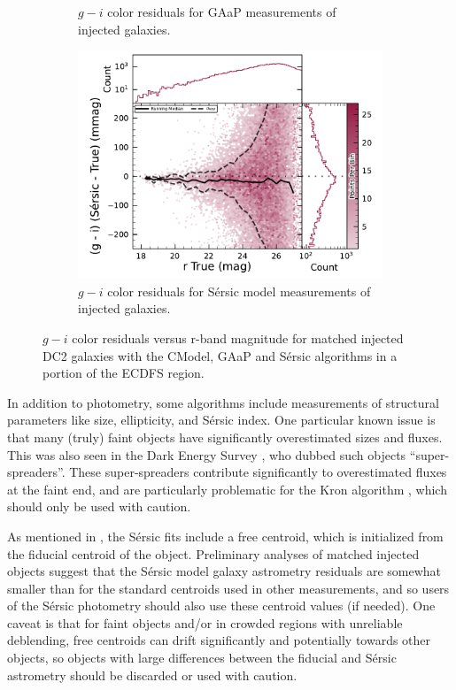 \begin{figure}[hbt!]
\begin{subfigure}[t]{0.31\textwidth}
  \caption{$g-i$ color residuals for \gls{GAaP} measurements of injected galaxies.}
  \end{subfigure}\hfill
    \begin{subfigure}[t]{0.31\textwidth}
\includegraphics[width=\linewidth]{injected_lsst_cells_v1_5063_r_color_sersic_g_minus_i}
  \caption{$g-i$ color residuals for S\'ersic model measurements of injected galaxies.}
  \end{subfigure}\hfill
\caption{$g-i$ color residuals versus r-band magnitude for matched injected DC2 galaxies with the CModel, \gls{GAaP} and S\'ersic algorithms in a portion of the \gls{ECDFS} region.}
\label{fig:injected_lsst_cells_v1_5063_r_color_g_minus_i}
\end{figure}
In addition to photometry, some algorithms include measurements of structural parameters like size, ellipticity, and S\'ersic index.
One particular known issue is that many (truly) faint objects have significantly overestimated sizes and fluxes.
This was also seen in the Dark Energy Survey \citep{2025arXiv250105739B}, who dubbed such objects ``super-spreaders''.
These super-spreaders contribute significantly to overestimated fluxes at the faint end, and are particularly problematic for the Kron algorithm \citep{1980ApJS...43..305K}, which should only be used with caution.

As mentioned in , the S\'ersic fits include a free centroid, which is initialized from the fiducial centroid of the object.
Preliminary analyses of matched injected objects suggest that the S\'ersic model galaxy \gls{astrometry} residuals are somewhat smaller than for the standard centroids used in other measurements, and so users of the S\'ersic photometry should also use these centroid values (if needed).
One caveat is that for faint objects and/or in crowded regions with unreliable deblending, free centroids can drift significantly and potentially towards other objects, so objects with large differences between the fiducial and S\'ersic \gls{astrometry} should be discarded or used with caution.

